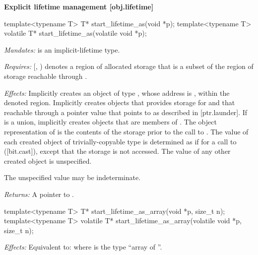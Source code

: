 \begin{addedblock}
\textbf{Explicit lifetime management \hspace{83mm}[obj.lifetime]}

\begin{codeblock}
template<typename T> T* start_lifetime_as(void *p);
template<typename T> volatile T* start_lifetime_as(volatile void *p);
\end{codeblock}

\begin{adjustwidth}{0.5cm}{0.5cm}
\emph{Mandates:}  is an implicit-lifetime type.

\emph{Requires:} [, ) denotes a region of allocated storage that is a subset of the region of storage reachable through .

\emph{Effects:} Implicitly creates an object  of type , whose address is , within the denoted region. Implicitly creates objects that  provides storage for and that reachable through a pointer value that points to  as described in [ptr.launder]. If  is a union, implicitly creates objects that are members of . The object representation of  is the contents of the storage prior to the call to . The value of each created object  of trivially-copyable type  is determined as if for a call to  ([bit.cast]), except that the storage is not accessed. The value of any other created object is unspecified. \begin{note}The unspecified value may be indeterminate.\end{note}

\emph{Returns:} A pointer to .
\end{adjustwidth}

\begin{codeblock}
template<typename T> T* start_lifetime_as_array(void *p, size_t n);
template<typename T> volatile T* start_lifetime_as_array(volatile void *p, size_t n);
\end{codeblock}

\begin{adjustwidth}{0.5cm}{0.5cm}
\emph{Effects:} Equivalent to:  where  is the type ``array of  ''.
\end{adjustwidth}

\end{addedblock}

